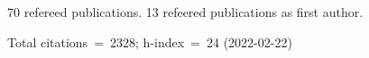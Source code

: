 70 refereed publications. 13 refeered publications as first author.

Total citations~=~2328; h-index~=~24 (2022-02-22)